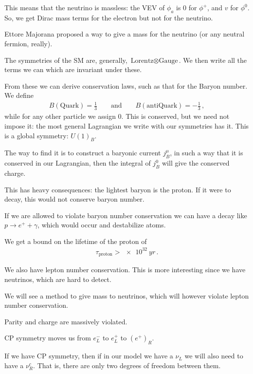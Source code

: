 \documentclass[main.tex]{subfiles}
\begin{document}
This means that the neutrino is massless: the VEV of \(\phi_{a}\) is 0 for \(\phi^{+}\), and \(v\) for \(\phi^{0}\). 
So, we get Dirac mass terms for the electron but not for the neutrino.

Ettore Majorana proposed a way to give a mass for the neutrino (or any neutral fermion, really).

The symmetries of the SM are, generally, \(\text{Lorentz} \otimes \text{Gauge}\).
We then write all the terms we can which are invariant under these. 

From these we can derive conservation laws, such as that for the Baryon number. We define 
%
\begin{align}
B(\text{Quark}) = \frac{1}{3} \qquad \text{and} \qquad
B(\text{antiQuark}) = - \frac{1}{3}
\,,
\end{align}
%
while for any other particle we assign 0.
This is conserved, but we need not impose it: the most general Lagrangian we write with our symmetries has it.
This is a global symmetry: \(U(1)_{B}\). 

The way to find it is to construct a baryonic current \(j^{\mu }_{B}\), in such a way that it is conserved in our Lagrangian, then the integral of \(j^{0}_{B}\) will give the conserved charge.

This has heavy consequences: the lightest baryon is the proton. If it were to decay, this would not conserve baryon number. 

If we are allowed to violate baryon number conservation we can have a decay like \(p \to e^{+ } + \gamma \), which would occur and destabilize atoms.


We get a bound on the lifetime of the proton of 
%
\begin{align}
\tau _{\text{proton}} > \SI{e32}{yr}
\,.
\end{align}

We also have lepton number conservation.
This is more interesting since we have neutrinos, which are hard to detect.

We will see a method to give mass to neutrinos, which will however violate lepton number conservation.

Parity and charge are massively violated.

CP symmetry moves us from \(e^{-}_{L}\) to \(e^{+}_{L}\) to \((e^{+})_{R}\).

If we have CP symmetry, then if in our model we have a \(\nu_{L}\) we will also need to have a \(\nu^{c}_{R}\).
That is, there are only two degrees of freedom between them.
\end{document}
